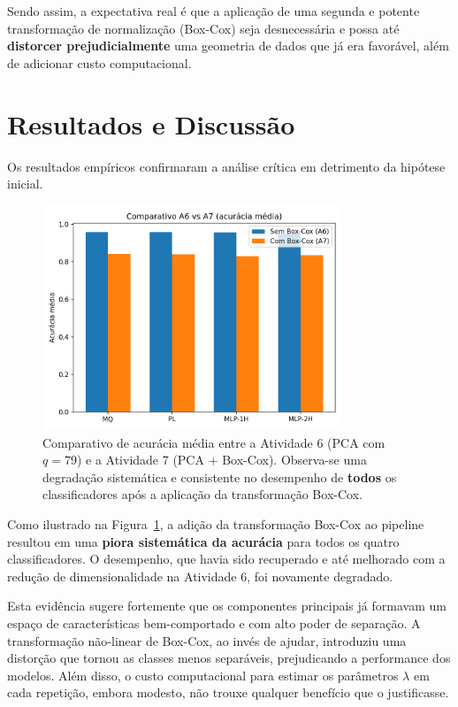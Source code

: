 \documentclass[a4paper,12pt]{article}
\begin{document}
Sendo assim, a expectativa real é que a aplicação de uma segunda e potente transformação de normalização (Box-Cox) seja desnecessária e possa até \textbf{distorcer prejudicialmente} uma geometria de dados que já era favorável, além de adicionar custo computacional.

\section{Resultados e Discussão}

Os resultados empíricos confirmaram a análise crítica em detrimento da hipótese inicial.

\begin{figure}[h!]
  \centering
  \includegraphics[width=0.8\textwidth]{../results/TC2/comparativo_A7_acc.png}
  \caption{Comparativo de acurácia média entre a Atividade 6 (PCA com \(q=79\)) e a Atividade 7 (PCA + Box-Cox). Observa-se uma degradação sistemática e consistente no desempenho de \textbf{todos} os classificadores após a aplicação da transformação Box-Cox.}
  \label{fig:comparativo_a7}
\end{figure}

Como ilustrado na Figura~\ref{fig:comparativo_a7}, a adição da transformação Box-Cox ao pipeline resultou em uma \textbf{piora sistemática da acurácia} para todos os quatro classificadores. O desempenho, que havia sido recuperado e até melhorado com a redução de dimensionalidade na Atividade 6, foi novamente degradado.

Esta evidência sugere fortemente que os componentes principais já formavam um espaço de características bem-comportado e com alto poder de separação. A transformação não-linear de Box-Cox, ao invés de ajudar, introduziu uma distorção que tornou as classes menos separáveis, prejudicando a performance dos modelos. Além disso, o custo computacional para estimar os parâmetros \(\lambda\) em cada repetição, embora modesto, não trouxe qualquer benefício que o justificasse.
\end{document}

